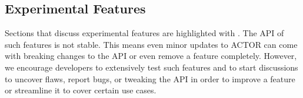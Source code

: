 \subsection{Experimental Features}

Sections that discuss experimental features are highlighted with \experimental.
The API of such features is not stable. This means even minor updates to ACTOR
can come with breaking changes to the API or even remove a feature completely.
However, we encourage developers to extensively test such features and to start
discussions to uncover flaws, report bugs, or tweaking the API in order to
improve a feature or streamline it to cover certain use cases.
